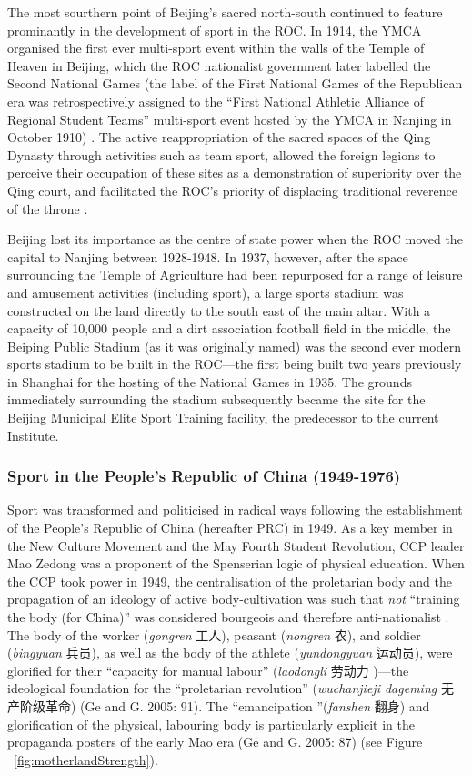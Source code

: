 The most sourthern point of Beijing's sacred north-south continued to feature prominantly in the development of sport in the ROC.  In 1914, the YMCA organised the first ever multi-sport event within the walls of the Temple of Heaven in Beijing, which the ROC nationalist government later labelled the Second National Games (the label of the First National Games of the Republican era was retrospectively assigned to the ``First National Athletic Alliance of Regional Student Teams'' multi-sport event hosted by the YMCA in Nanjing in October 1910) \citep[441]{Li2015}. The active reappropriation of the sacred spaces of the Qing Dynasty through activities such as team sport, allowed the foreign legions to perceive their occupation of these sites as a demonstration of superiority over the Qing court, and facilitated the ROC's priority of displacing traditional reverence of the throne \citep{Hevia1990}.

Beijing lost its importance as the centre of state power when the ROC moved the capital to Nanjing between 1928-1948.  In 1937, however, after the space surrounding the Temple of Agriculture had been repurposed for a range of leisure and amusement activities (including sport), a large sports stadium was constructed on the land directly to the south east of the main altar.  With a capacity of 10,000 people and a dirt association football field in the middle, the Beiping Public Stadium (as it was originally named) was the second ever modern sports stadium to be built in the ROC---the first being built two years previously in Shanghai for the hosting of the National Games in 1935.  The grounds immediately surrounding the stadium subsequently became the site for the Beijing Municipal Elite Sport Training facility, the predecessor to the current Institute.


\subsubsection{Sport in the People's Republic of China (1949-1976)}
Sport was transformed and politicised in radical ways following the establishment of the People’s Republic of China (hereafter PRC) in 1949.  As a key member in the New Culture Movement and the May Fourth Student Revolution, CCP leader Mao Zedong was a proponent of the Spenserian logic of physical education.   When the CCP took power in 1949, the centralisation of the proletarian body and the propagation of an ideology of active body-cultivation was such that \textit{not} ``training the body (for China)'' was considered bourgeois and therefore anti-nationalist \citep[58]{Brownell1995}.  The body of the worker (\textit{gongren} 工人), peasant (\textit{nongren} 农), and soldier (\textit{bingyuan} 兵员), as well as the body of the athlete (\textit{yundongyuan} 运动员), were glorified for their ``capacity for manual labour'' (\textit{laodongli} 劳动力 )---the ideological foundation for the ``proletarian revolution'' (\textit{wuchanjieji dageming} 无产阶级革命) (Ge and G. 2005: 91).  The ``emancipation ''(\textit{fanshen} 翻身) and glorification of the physical, labouring body is particularly explicit in the propaganda posters of the early Mao era (Ge and G. 2005: 87) (see Figure ~\ref{fig:motherlandStrength}).

